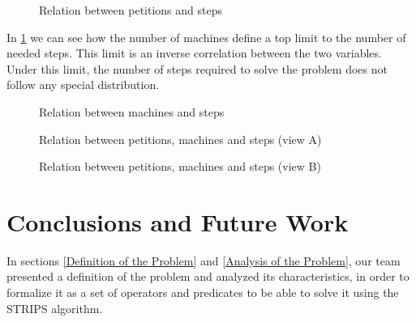 \documentclass[12pt,a4paper,oneside]{article}
\numberwithin{equation}{section}
\numberwithin{equation}{section}
\theoremstyle{definition}
\begin{document}
\begin{figure}[h!]
	\centering
	\caption{Relation between petitions and steps}
	\label{fig:2d-petitions}
\end{figure}

In \ref{fig:2d-petitions} we can see how the number of machines define a top limit to the number of needed steps. This limit is an inverse correlation between the two variables. Under this limit, the number of steps required to solve the problem does not follow any special distribution.

\begin{figure}[h!]
	\centering
	\caption{Relation between machines and steps}
	\label{fig:2d-machines}
\end{figure}

\newcommand{\plotthreedee}[2]{
	\begin{axis}[
		view={#2}{#1},
		xlabel=Petitions,
		ylabel=Machines,
		zlabel=Steps,
	]
	\addplot3[
		scatter,
		only marks,
	]
	table[
		x=Petitions,
		y=Machines,
		z=Steps,
		col sep=comma,
	]{results.csv};
	\end{axis}
}

\begin{figure}
	\centering
	\caption{Relation between petitions, machines and steps (view A)}
\label{fig:3d-a}
\end{figure}

\begin{figure}
	\centering
	\caption{Relation between petitions, machines and steps (view B)}
	\label{fig:3d-a}
\end{figure}



\section{Conclusions and Future Work} \label{Conclusions}

In sections \ref{Definition of the Problem} and \ref{Analysis of the Problem}, our team presented a definition of the problem and analyzed its characteristics, in order to formalize it as a set of operators and predicates to be able to solve it using the STRIPS algorithm.
\end{document}
